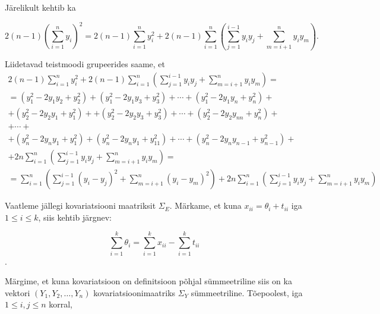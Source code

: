 \documentclass[a4paper,12pt,oneside]{article}
\numberwithin{equation}{section}
\theoremstyle{definition}
\begin{document}
Järelikult kehtib ka 

\begin{equation*}
2 \left( n-1 \right) \left( \sum \limits_{i=1}^n y_{i} \right)^2 =  2 \left( n-1 \right) \sum \limits_{i=1}^n y_{i}^2  + 2 \left( n-1 \right) \sum \limits_{i=1}^n  \left( \sum \limits_{j=1}^{i-1} y_{i} y_{j} + \sum \limits_{m=i+1}^n {y_{i}}{y_{m}} \right) \text{.}
\end{equation*}

Liidetavad teistmoodi grupeerides saame, et
\begin{equation*}
\begin{gathered}
2 \left( n-1 \right) \sum \limits_{i=1}^n y_{i}^2  + 2 \left( n-1 \right) \sum \limits_{i=1}^n  \left( \sum \limits_{j=1}^{i-1} y_{i} y_{j} + \sum \limits_{m=i+1}^n {y_{i}}{y_{m}} \right) = \\
= \left( y_{1}^2 - 2 y_{1} y_{2} + y_{2}^2 \right) + \left( y_{1}^2 - 2 y_{1} y_{3} + y_{3}^2 \right) + \cdots +\left( y_{1}^2 - 2 y_{1} y_{n} + y_{n}^2 \right) + \\
+ \left( y_{2}^2 - 2 y_{2} y_{1} + y_{1}^2 \right) + 
 +  \left( y_{2}^2 - 2 y_{2} y_{3} + y_{3}^2 \right) + \cdots + \left( y_{2}^2 - 2 y_{2} y_{nn} + y_{n}^2 \right) + \\
 + \cdots + \\
 + \left( y_{n}^2 - 2 y_{n} y_{1} + y_{1}^2 \right) + \left( y_{n}^2 - 2 y_{n} y_{1} + y_{11}^2 \right) + \cdots + \left( y_{n}^2 - 2 y_{n} y_{n-1} + y_{n-1}^2 \right) + \\
 + 2 n \sum \limits_{i=1}^n  \left( \sum \limits_{j=1}^{i-1} y_{i} y_{j} + \sum \limits_{m=i+1}^n {y_{i}}{y_{m}} \right) =\\
= \sum \limits_{i=1}^n  \left( \sum \limits_{j=1}^{i-1} (y_{i} - y_{j})^2 + \sum \limits_{m=i+1}^n ({y_{i}} - {y_{m}})^2 \right) +  2 n \sum \limits_{i=1}^n  \left( \sum \limits_{j=1}^{i-1} y_{i} y_{j} + \sum \limits_{m=i+1}^n {y_{i}}{y_{m}} \right)
\end{gathered}
\end{equation*}

Vaatleme jällegi kovariatsiooni maatriksit $\Sigma_E$. Märkame, et kuna $x_{ii} = \theta_i + t_{ii}$ iga $ 1 \leq i \leq k$, siis kehtib järgnev:

\begin{equation*}
 \sum \limits_{i=1}^k \theta_i = \sum \limits_{i=1}^k x_{ii} - \sum \limits_{i=1}^k t_{ii} 
\end{equation*}.

Märgime, et kuna kovariatsioon on definitsioon põhjal sümmeetriline siis on ka vektori $(Y_1,Y_2,\ldots,Y_n)$ kovariatsioonimaatriks $\Sigma_Y$ sümmeetriline. Tõepoolest, iga $1 \leq i,j \leq n$ korral,  
\end{document}
